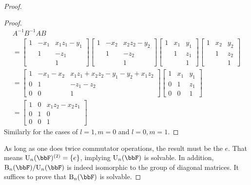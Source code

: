 \begin{proof}
\begin{proof}
    \begin{multline}
        A^{-1}B^{-1}AB\\
        =\begin{bmatrix}
            1 & -x_1 & x_1z_1-y_1\\
            {} & 1 & -z_1 \\
            {} & {} & 1  
          \end{bmatrix}
          \begin{bmatrix}
              1 & -x_2 & x_2z_2-y_2\\
              {} & 1 & -z_2 \\
              {} & {} & 1  
            \end{bmatrix}
            \begin{bmatrix}
              1 & x_1 & y_1\\
              {} & 1 & z_1 \\
              {} & {} & 1  
            \end{bmatrix}
            \begin{bmatrix}
              1 & x_2 & y_2\\
              {} & 1 & z_2 \\
              {} & {} & 1  
            \end{bmatrix}\\
            =
            \begin{bmatrix}
                1 & -x_1-x_2 & x_1z_1+x_2z_2-y_1-y_2+x_1z_2\\
                {0} & 1 & -z_1-z_2 \\
                {0} & {0} & 1  
              \end{bmatrix}
              \begin{bmatrix}
                1 & x_1 & y_1\\
                {0} & 1 & z_1 \\
                {0} & {0} & 1  
              \end{bmatrix}\\
            = \begin{bmatrix}
                1 & {0} & x_1z_2-x_2z_1\\
                {0} & 1 & {0} \\
                {0} & {0} & 1  
              \end{bmatrix}
    \end{multline}
    Similarly for the cases of $l=1,m=0$ and $l=0,m=1$. 

\end{proof}

As long as one does twice commutator operations, the result must be the $e$. That means $\mathrm{U}_n(\bbF)^{(2)}=\{e\}$, implying $\mathrm{U}_n(\bbF)$ is solvable. In addition, $\mathrm{B}_n(\bbF)/\mathrm{U}_n(\bbF)$ is indeed isomorphic to the group of diagonal matrices. It suffices to prove that $\mathrm{B}_n(\bbF)$ is solvable.

\end{proof}

